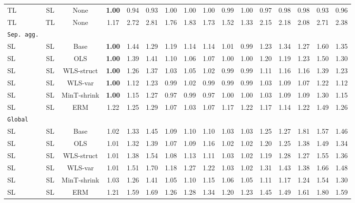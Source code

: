 \documentclass[preprint, 3p, times, twocolumn]{elsarticle}
\begin{document}
\begin{table}
\begin{center}
{\begin{tabular}{l c  cccccccccccccc}
    \hspace{0.1cm} 	TL	&SL	&None	&\textbf{1.00}	&0.94	&0.93	&1.00	&1.00	&1.00	&0.99	&1.00	&0.97	&0.98	&0.98	&0.93	&0.96	\\
    \hspace{0.1cm} 	TL	&TL	&None	&1.17	&2.72	&2.81	&1.76	&1.83	&1.73	&1.52	&1.33	&2.15	&2.18	&2.08	&2.71	&2.38	\\
    \midrule																	
    \texttt{Sep. agg.}																	\\
    \hspace{0.1cm} 	SL	&SL	&Base	&\textbf{1.00}	&1.44	&1.29	&1.19	&1.14	&1.14	&1.01	&0.99	&1.23	&1.34	&1.27	&1.60	&1.35	\\
    \hspace{0.1cm} 	SL	&SL	&OLS	&\textbf{1.00}	&1.39	&1.41	&1.10	&1.06	&1.07	&1.00	&1.00	&1.20	&1.19	&1.23	&1.50	&1.30	\\
    \hspace{0.1cm} 	SL	&SL	&WLS-struct	&\textbf{1.00}	&1.26	&1.37	&1.03	&1.05	&1.02	&0.99	&0.99	&1.11	&1.16	&1.16	&1.39	&1.23	\\
    \hspace{0.1cm} 	SL	&SL	&WLS-var	&\textbf{1.00}	&1.12	&1.23	&0.99	&1.02	&0.99	&0.99	&0.99	&1.03	&1.09	&1.07	&1.22	&1.12	\\
    \hspace{0.1cm} 	SL	&SL	&MinT-shrink	&\textbf{1.00}	&1.15	&1.27	&0.97	&0.99	&0.97	&1.00	&1.00	&1.03	&1.09	&1.09	&1.30	&1.15	\\
    \hspace{0.1cm} 	SL	&SL	&ERM	&1.22	&1.25	&1.29	&1.07	&1.03	&1.07	&1.17	&1.22	&1.17	&1.14	&1.22	&1.49	&1.26	\\
    \midrule																	
    \texttt{Global}																	\\
    \hspace{0.1cm} 	SL	&SL	&Base	&1.02	&1.33	&1.45	&1.09	&1.10	&1.10	&1.03	&1.03	&1.25	&1.27	&1.81	&1.57	&1.46	\\
    \hspace{0.1cm} 	SL	&SL	&OLS	&1.01	&1.32	&1.39	&1.07	&1.09	&1.16	&1.02	&1.02	&1.20	&1.25	&1.38	&1.49	&1.34	\\
    \hspace{0.1cm} 	SL	&SL	&WLS-struct	&1.01	&1.38	&1.54	&1.08	&1.13	&1.11	&1.03	&1.02	&1.19	&1.28	&1.27	&1.55	&1.36	\\
    \hspace{0.1cm} 	SL	&SL	&WLS-var	&1.01	&1.51	&1.70	&1.18	&1.27	&1.22	&1.03	&1.02	&1.31	&1.43	&1.38	&1.66	&1.48	\\
    \hspace{0.1cm} 	SL	&SL	&MinT-shrink	&1.03	&1.26	&1.41	&1.05	&1.10	&1.15	&1.06	&1.05	&1.11	&1.17	&1.24	&1.54	&1.30	\\
    \hspace{0.1cm} 	SL	&SL	&ERM	&1.21	&1.59	&1.69	&1.26	&1.28	&1.34	&1.20	&1.23	&1.45	&1.49	&1.61	&1.80	&1.59	\\      
    \bottomrule
    \end{tabular}}
    \end{center}
    \end{table}
\end{document}
